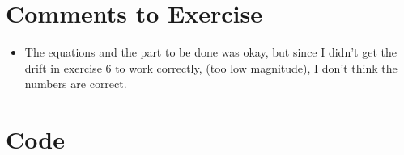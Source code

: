 \documentclass[x11names]{article}
\begin{document}
\appendix
\section{Comments to Exercise}
  
  \begin{itemize}
    \item The equations and the part to be done was okay, but since I didn't get the drift in exercise 6 to work correctly, (too low magnitude), I don't think the numbers are correct.
  \end{itemize}



\section{Code}
  \label{sec:code}
  
\end{document}
